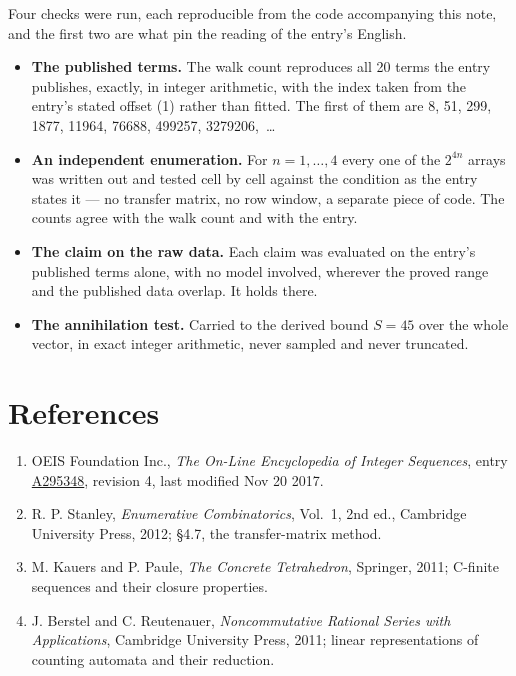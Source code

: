 \documentclass[11pt]{article}
\theoremstyle{definition}
\begin{document}
Four checks were run, each reproducible from the code accompanying this note, and the first two are what pin the reading of the entry's English.

\begin{itemize}

\item {\bfseries The published terms.} The walk count reproduces all 20 terms the entry publishes, exactly, in integer arithmetic, with the index taken from the entry's stated offset (1) rather than fitted. The first of them are 8, 51, 299, 1877, 11964, 76688, 499257, 3279206,~\dots

\item {\bfseries An independent enumeration.} For $n = 1,\dots,4$ every one of the $2^{4n}$ arrays was written out and tested cell by cell against the condition as the entry states it --- no transfer matrix, no row window, a separate piece of code. The counts agree with the walk count and with the entry.

\item {\bfseries The claim on the raw data.} Each claim was evaluated on the entry's published terms alone, with no model involved, wherever the proved range and the published data overlap. It holds there.

\item {\bfseries The annihilation test.} Carried to the derived bound $S = 45$ over the whole vector, in exact integer arithmetic, never sampled and never truncated.

\end{itemize}

\section{References}

\begin{enumerate}

\item OEIS Foundation Inc., \emph{The On-Line Encyclopedia of Integer Sequences}, entry \href{https://oeis.org/A295348}{A295348}, revision 4, last modified Nov 20 2017.

\item R. P. Stanley, \emph{Enumerative Combinatorics}, Vol.~1, 2nd ed., Cambridge University Press, 2012; \S4.7, the transfer-matrix method.

\item M. Kauers and P. Paule, \emph{The Concrete Tetrahedron}, Springer, 2011; C-finite sequences and their closure properties.

\item J. Berstel and C. Reutenauer, \emph{Noncommutative Rational Series with Applications}, Cambridge University Press, 2011; linear representations of counting automata and their reduction.

\end{enumerate}
\end{document}
